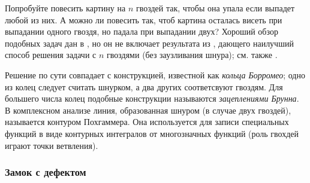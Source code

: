 \begin{addedbytheeditors}
Попробуйте повесить картину на $n$ гвоздей так, чтобы она упала если выпадет любой из них.
А можно ли повесить так, чтоб картина осталась висеть при выпадании одного гвоздя, но падала при выпадании двух?
Хороший обзор подобных задач дан в \cite{demaine2014}, но он не включает результата из \cite{gartside-greenwood}, дающего наилучший способ решения задачи с $n$ гвоздями (без заузливания шнура); см. также \cite{epifanov}.

Решение по сути совпадает с конструкцией, известной как \emph{кольца Борромео};
одно из колец следует считать шнурком, а два других соответсвуют гвоздям.
Для большего числа колец подобные конструкции называются \emph{зацеплениями Брунна}.
В комплексном анализе линия, образованная шнуром (в случае двух гвоздей), называется контуром Похгаммера. Она используется для записи специальных функций в виде контурных интегралов от многозначных функций (роль гвохдей играют точки ветвления).
\end{addedbytheeditors}

\subsubsection*{Замок с дефектом}

